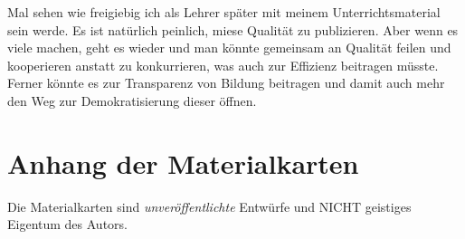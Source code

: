 Mal sehen wie freigiebig ich als Lehrer später mit meinem Unterrichtsmaterial sein werde. Es ist natürlich peinlich, miese Qualität zu publizieren. Aber wenn es viele machen, geht es wieder und man könnte gemeinsam an Qualität feilen und kooperieren anstatt zu konkurrieren, was auch zur Effizienz beitragen müsste. Ferner könnte es zur Transparenz von Bildung beitragen und damit auch mehr den Weg zur Demokratisierung dieser öffnen. 










\section{Anhang der Materialkarten \label{MaterialkartenStart}}
Die Materialkarten sind \emph{unveröffentlichte} Entwürfe und NICHT geistiges Eigentum des Autors. 



\clearpage
\newpage







